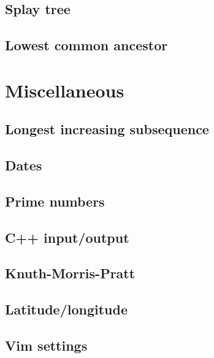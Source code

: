 \subsection{Splay tree}
\raggedbottom
\hrulefill
\subsection{Lowest common ancestor}
\raggedbottom
\hrulefill

\section{Miscellaneous}
\subsection{Longest increasing subsequence}
\raggedbottom
\hrulefill
\subsection{Dates}
\raggedbottom
\hrulefill
\subsection{Prime numbers}
\raggedbottom
\hrulefill
\subsection{C++ input/output}
\raggedbottom
\hrulefill
\subsection{Knuth-Morris-Pratt}
\raggedbottom
\hrulefill
\subsection{Latitude/longitude}
\raggedbottom
\hrulefill
\subsection{Vim settings}
\raggedbottom
\hrulefill

